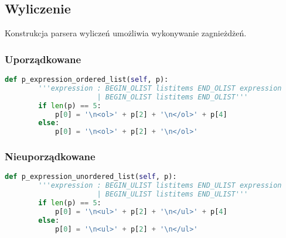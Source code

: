 \subsection{Wyliczenie}

Konstrukcja parsera wyliczeń umożliwia wykonywanie zagnieżdżeń.

\subsubsection{Uporządkowane}

\begin{lstlisting}[language={Python}, caption={Gramatyka - tabela}, label={gramatyka-tekst} ]
    def p_expression_ordered_list(self, p):
        '''expression : BEGIN_OLIST listitems END_OLIST expression
                      | BEGIN_OLIST listitems END_OLIST'''
        if len(p) == 5:
            p[0] = '\n<ol>' + p[2] + '\n</ol>' + p[4]
        else:
            p[0] = '\n<ol>' + p[2] + '\n</ol>'
\end{lstlisting}

\subsubsection{Nieuporządkowane}

\begin{lstlisting}[language={Python}, caption={Gramatyka - tabela}, label={gramatyka-tekst} ]
    def p_expression_unordered_list(self, p):
        '''expression : BEGIN_ULIST listitems END_ULIST expression
                      | BEGIN_ULIST listitems END_ULIST'''
        if len(p) == 5:
            p[0] = '\n<ul>' + p[2] + '\n</ul>' + p[4]
        else:
            p[0] = '\n<ul>' + p[2] + '\n</ul>'
\end{lstlisting}